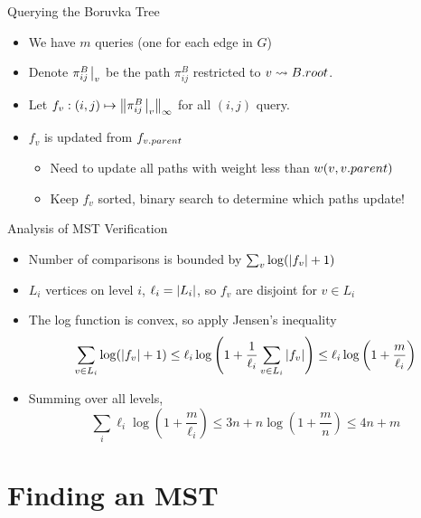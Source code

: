 \documentclass[aspectratio=169]{beamer}
\begin{document}
\begin{frame}{Querying the Boruvka Tree}
    \begin{itemize}
        \item We have $m$ queries (one for each edge in $G$)
              \pause
        \item Denote $\pi^{B}_{ij} \eval_v$ be the path $\pi^{B}_{ij}$ restricted to $v \rightsquigarrow B.\emph{root}$.
              \pause
        \item Let $f_v: (i, j) \mapsto \norm{\pi^{B}_{ij} \eval_v}_\infty$ for all $(i, j)$ query.
              \pause
        \item $f_v$ is updated from $f_{v.\emph{parent}}$
              \pause
              \begin{itemize}
                  \item Need to update all paths with weight less than $w(v, v.\emph{parent})$
                  \item Keep $f_v$ sorted, binary search to determine which paths update!
              \end{itemize}
    \end{itemize}
\end{frame}

\begin{frame}{Analysis of MST Verification}
    \begin{itemize}
        \item Number of comparisons is bounded by $\sum_v \log( \abs{f_v} + 1 )$
              \pause
        \item $L_i$ vertices on level $i$, $\ell_i = \abs{L_i}$, so $f_v$ are disjoint for $v \in L_i$
              \pause
        \item The log function is convex, so apply Jensen's inequality
              $$
                  \sum_{v \in L_i} \log( \abs{f_v} + 1 ) \le \ell_i \log \left( 1 + \frac{1}{\ell_i} \sum_{v \in L_i} \abs{f_v} \right) \le \ell_i \log \left( 1 + \frac{m}{\ell_i} \right)
              $$
              \pause
              \vspace{-\baselineskip}
        \item Summing over all levels,
              $$
                  \sum_{i} \ell_i \log \left( 1 + \frac{m}{\ell_i} \right) \le 3n + n \log\left( 1 + \frac{m}{n} \right) \le 4n + m
              $$
    \end{itemize}

\end{frame}


\section{Finding an MST}
\frame{\tableofcontents[currentsection]}
\end{document}
